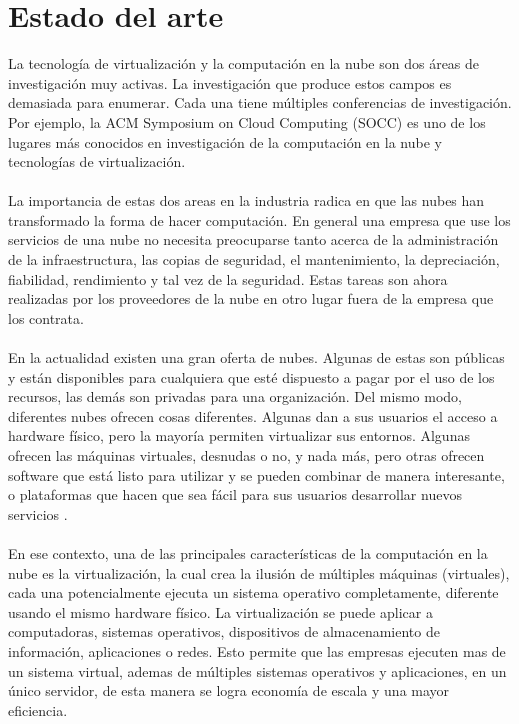 
\chapter{Estado del arte}

\label{aprmaqvir}
La tecnología de virtualización y la computación en la nube son dos áreas de investigación muy activas. La investigación que produce estos campos es demasiada para enumerar. Cada una tiene múltiples conferencias de investigación. Por ejemplo, la ACM Symposium on Cloud Computing (SOCC) \cite{socc15} es uno de los lugares más conocidos en investigación de la computación en la nube y tecnologías de virtualización.\\
\\
La importancia de estas dos areas en la industria radica en que las nubes han transformado la forma de hacer computación. En general una empresa que use los servicios de una nube no necesita preocuparse tanto acerca de la administración de la infraestructura, las copias de seguridad, el mantenimiento, la depreciación, fiabilidad, rendimiento y tal vez de la seguridad. Estas tareas son ahora realizadas por los proveedores de la nube en otro lugar fuera de la empresa que los contrata.\\
\\
En la actualidad existen una gran oferta de nubes. Algunas de estas son públicas y están disponibles para cualquiera que esté dispuesto a pagar por el uso de los recursos, las demás son privadas para una organización. Del mismo modo, diferentes nubes ofrecen cosas diferentes. Algunas dan a sus usuarios el acceso a hardware físico, pero la mayoría permiten virtualizar sus entornos. Algunas ofrecen  las máquinas virtuales, desnudas o no, y nada más, pero otras ofrecen software que está listo para
utilizar y se pueden combinar de manera interesante, o plataformas que hacen que sea fácil para
sus usuarios desarrollar nuevos servicios \cite{tanembaum14}.\\
\\
En ese contexto, una de las principales características de la computación en la nube es la virtualización, la cual crea la ilusión de múltiples máquinas (virtuales), cada una potencialmente ejecuta un sistema operativo completamente, diferente usando el mismo hardware físico. La virtualización se puede aplicar a computadoras, sistemas operativos, dispositivos de almacenamiento de información, aplicaciones o redes. Esto permite que las empresas ejecuten mas de un sistema virtual, ademas de múltiples sistemas operativos y aplicaciones, en un único servidor, de esta manera se logra economía de escala y una mayor eficiencia.\\
\\
